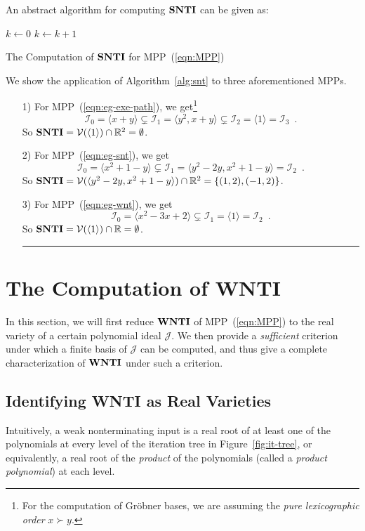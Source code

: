 \documentclass{jssc}
\newcommand{\rulex}{\hfill\rule{1mm}{3mm}}
\newcommand{\I}{\mathcal{I}}
\newcommand{\J}{\mathcal{J}}
\newcommand{\V}{\mathcal{V}}
\newcommand{\SNTI}{{\bf SNTI}}
\newcommand{\WNTI}{{\bf WNTI}}
\begin{document}
An abstract algorithm for computing $\SNTI$ can be given as:
\begin{algorithm}\label{alg:snt}
$k \leftarrow 0$\;
\While{$\I_{k} \neq \I_{k+1}$}
    {$k \leftarrow k+1$\;}
    {\KwRet{$\V(\I_k) \cap \mathbb{R}^n$}\;}
\caption{The Computation of $\SNTI$ for MPP~(\ref{eqn:MPP})}
\end{algorithm}

\begin{example} \label{eg:computation-snt}
We show the application of Algorithm~\ref{alg:snt} to three aforementioned MPPs.
\begin{enumerate}
\item[1)] For MPP~(\ref{eqn:eg-exe-path}), we get\footnote{For the computation of Gr\"obner bases, we are assuming the \emph{pure lexicographic order} $x \succ y$.}
    \[
    \I_0=\langle x+y \rangle \subsetneq \I_1=\langle y^2,x+y \rangle \subsetneq \I_2=\langle 1 \rangle = \I_3 \enspace .
    \]
    So $\SNTI = \V(\langle 1 \rangle) \cap \mathbb{R}^2 = \emptyset$.
\item[2)] For MPP~(\ref{eqn:eg-snt}), we get
    \[
    \I_0=\langle x^2+1-y \rangle \subsetneq \I_1=\langle y^2-2y,x^2+1-y \rangle = \I_2 \enspace .
    \]
    So $\SNTI=\V(\langle y^2-2y,x^2+1-y \rangle) \cap \mathbb{R}^2=\{(1,2),(-1,2)\}$.
\item[3)] For MPP~(\ref{eqn:eg-wnt}), we get
    \[
    \I_0=\langle x^2-3x+2 \rangle \subsetneq \I_1=\langle 1 \rangle = \I_2 \enspace .
    \]
    So $\SNTI=\V(\langle1\rangle) \cap \mathbb{R}=\emptyset$. \rulex
\end{enumerate}
\end{example}


\section{The Computation of WNTI}\label{sec:wnt}
In this section, we will first reduce $\WNTI$ of MPP~(\ref{eqn:MPP}) to the real variety of a certain polynomial ideal $\J$. We then provide a \emph{sufficient} criterion under which a finite basis of $\J$ can be computed, and thus give a complete characterization of $\WNTI$ under such a criterion.

\subsection{Identifying WNTI as Real Varieties}
Intuitively, a weak nonterminating input is a real root of at least one of the polynomials at every level of the iteration tree in Figure~\ref{fig:it-tree}, or equivalently, a real root of the \emph{product} of the polynomials (called a \emph{product polynomial}) at each level.
\end{document}
